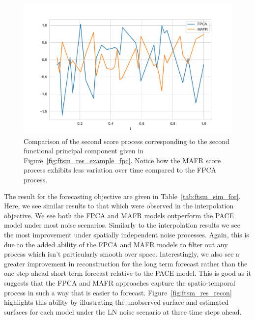 \begin{figure}[htbp!] 
	\centering    
	\includegraphics[width=1.0\textwidth]{ftsm_res_zeta_example}
	\caption{Comparison of the second score process corresponding to the second functional principal component given in Figure~\ref{fig:ftsm_res_example_fpc}. Notice how the MAFR score process exhibits less variation over time compared to the FPCA process.}
	\label{fig:ftsm_res_example_zeta}
\end{figure}

The result for the forecasting objective are given in Table~\ref{tab:ftsm_sim_for}.
Here, we see similar results to that which were observed in the interpolation objective.
We see both the FPCA and MAFR models outperform the PACE model under most noise scenarios.
Similarly to the interpolation results we see the most improvement under spatially independent noise processes.
Again, this is due to the added ability of the FPCA and MAFR models to filter out any process which isn't particularly smooth over space. 
Interestingly, we also see a greater improvement in reconstruction for the long term forecast rather than the one step ahead short term forecast relative to the PACE model.
This is good as it suggests that the FPCA and MAFR approaches capture the spatio-temporal process in such a way that is easier to forecast. 
Figure~\ref{fig:ftsm_res_recon} highlights this ability by illustrating the unobserved surface and estimated surfaces for each model under the LN noise scenario at three time steps ahead.

